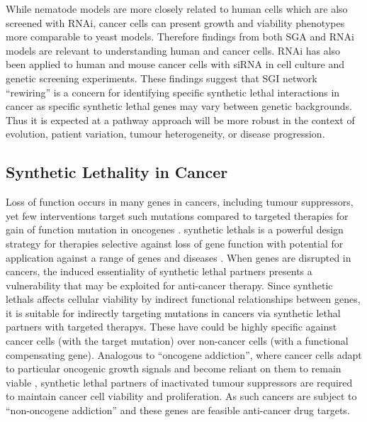 While nematode models are more closely related to human cells which are also screened with \gls{RNAi}, cancer cells can present growth and viability phenotypes more comparable to yeast models. Therefore findings from both \gls{SGA} and \gls{RNAi} models are relevant to understanding human and cancer cells. \gls{RNAi} has also been applied to human and mouse cancer cells with \acrfull{siRNA} in cell culture and genetic screening experiments. These findings suggest that \gls{SGI} network ``rewiring'' is a concern for identifying specific \gls{synthetic lethal} interactions in cancer as specific \gls{synthetic lethal} genes may vary between genetic backgrounds. Thus it is expected at a \gls{pathway} approach will be more robust in the context of evolution, patient variation, tumour heterogeneity, or disease progression.  

\subsection{Synthetic Lethality in Cancer}

Loss of function occurs in many genes in cancers, including \glspl{tumour suppressor}, yet few interventions target such \glspl{mutation} compared to targeted therapies for gain of function \gls{mutation} in \glspl{oncogene} \citep{Kaelin2005}. \Glspl{synthetic lethal} is a powerful design strategy for therapies selective against loss of gene function with potential for application against a range of genes and diseases \citep{Kaelin2009, Fece2015}. When genes are disrupted in cancers, the \gls{induced essentiality} of \gls{synthetic lethal} partners presents a vulnerability that may be exploited for anti-cancer therapy. Since \glspl{synthetic lethal} affects cellular viability by indirect functional relationships between genes, it is suitable for indirectly targeting \glspl{mutation} in cancers via \gls{synthetic lethal} partners with \glspl{targeted therapy}. These have could be highly specific against cancer cells (with the target \gls{mutation}) over non-cancer cells (with a functional compensating gene). Analogous to ``\gls{oncogene addiction}'', where cancer cells adapt to particular oncogenic growth signals and become reliant on them to remain viable \citep{Luo2009, Weinstein2000}, \gls{synthetic lethal} partners of inactivated \glspl{tumour suppressor} are required to maintain cancer cell viability and proliferation. As such cancers are subject to ``\gls{non-oncogene addiction}'' and these genes are feasible anti-cancer drug targets. 


